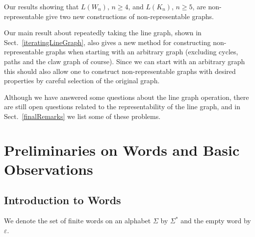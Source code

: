 \documentclass[12pt]{article}
\begin{document}
Our results showing that $L(W_n)$, $n \geqslant 4$, and $L(K_{n})$, $n \geqslant 5$, are non-representable give two new constructions of non-representable graphs.



Our main result about repeatedly taking the line graph, shown in Sect.~\ref{iteratingLineGraph}, also gives a new method for constructing non-representable graphs when starting with an arbitrary graph (excluding cycles, paths and the claw graph of course). Since we can start with an arbitrary graph this should also allow one to construct non-representable graphs with desired properties by careful selection of the original graph. 



Although we have answered some questions about the line graph operation, there are still open questions related to the representability of the line graph, and in Sect.~\ref{finalRemarks} we list some of these problems.  

\section{Preliminaries on Words and Basic Observations}

\subsection{Introduction to Words}

We denote the set of finite words on an alphabet $\Sigma$ by $\Sigma^*$ and the empty word by $\varepsilon$.
\end{document}
